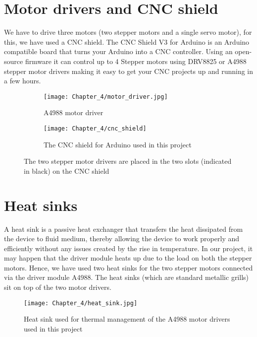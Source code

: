 \section{Motor drivers and CNC shield}

We have to drive three motors (two stepper motors and a single servo motor), for this, we have used a CNC shield. The CNC Shield V3 for Arduino is an Arduino compatible board that turns your Arduino into a CNC controller. Using an open-source firmware it can control up to 4 Stepper motors using DRV8825 or A4988 stepper motor drivers making it easy to get your CNC projects up and running in a few hours. 

\begin{figure}[h]

\begin{subfigure}{0.5\textwidth}
\texttt{[image: Chapter\_4/motor\_driver.jpg]} 
\caption{A4988 motor driver}
\label{fig:motor_driver}
\end{subfigure}
\begin{subfigure}{0.5\textwidth}
\hspace{8mm}
\texttt{[image: Chapter\_4/cnc\_shield]} 
\caption{The CNC shield for Arduino used in this project}
\label{fig:shield}
\end{subfigure}

\caption{The two stepper motor drivers are placed in the two slots (indicated in black) on the CNC shield}
\label{fig:driver_and_shield}
\end{figure}


\section{Heat sinks}

A heat sink is a passive heat exchanger that transfers the heat dissipated from the device to fluid medium, thereby allowing the device to work properly and efficiently without any issues created by the rise in temperature. In our project, it may happen that the driver module heats up due to the load on both the stepper motors. Hence, we have used two heat sinks for the two stepper motors connected via the driver module A4988. The heat sinks (which are standard metallic grills) sit on top of the two motor drivers.

\begin{figure}[h]
    \centering
    \texttt{[image: Chapter\_4/heat\_sink.jpg]}
    \caption{Heat sink used for thermal management of the A4988 motor drivers used in this project}
    \label{fig:sink}
\end{figure}



